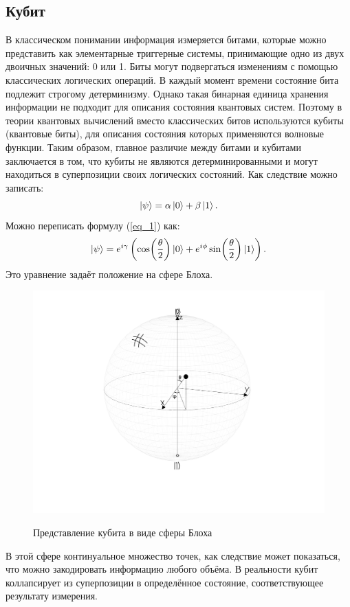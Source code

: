 \documentclass[12pt,a4paper]{article}
\begin{document}
	\subsection{Кубит}
	В классическом понимании информация измеряется битами, которые можно представить как элементарные триггерные системы, принимающие одно из двух двоичных значений: 0 или 1. Биты могут подвергаться изменениям с помощью классических логических операций. В каждый момент времени состояние бита подлежит строгому детерминизму. Однако такая бинарная единица хранения информации не подходит для описания состояния квантовых систем. Поэтому в теории квантовых вычислений вместо классических битов используются кубиты (квантовые биты), для описания состояния которых применяются волновые функции. Таким образом, главное различие между битами и кубитами заключается в том, что кубиты не являются детерминированными и могут находиться в суперпозиции своих логических состояний\cite{1}.
	Как следствие можно записать:\\
	\begin{equation} \label{eq_1}
		\ket{\psi}=\alpha\ket{0}+\beta\ket{1}.
	\end{equation}
	Можно переписать формулу (\ref{eq_1}) как:
	\begin{equation} \label{eq_2}
		\ket{\psi}=e^{i\gamma}\left(\cos(\frac{\theta}{2})\ket{0}+e^{i\phi}\sin(\frac{\theta}{2})\ket{1}\right).
	\end{equation}
	Это уравнение задаёт положение на сфере Блоха. \\
	\begin{figure}[h!]
		\centering
		\includegraphics[width=0.7\linewidth]{2.jpg}
		\label{fig_2}\caption{Представление кубита в виде сферы Блоха}
	\end{figure}
	
	В этой сфере континуальное множество точек, как следствие может показаться, что можно закодировать информацию любого объёма. В реальности кубит коллапсирует из суперпозиции в определённое состояние, соответствующее результату измерения.\\
\end{document}
